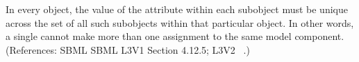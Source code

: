In every \Event object, the value of the attribute  within
each \EventAssignment subobject must be unique across the set of all such
\EventAssignment subobjects within that particular \Event object.  In other
words, a single \Event cannot make more than one assignment to the same
model component.  (References: SBML SBML L3V1 Section 4.12.5; L3V2 ~.)
